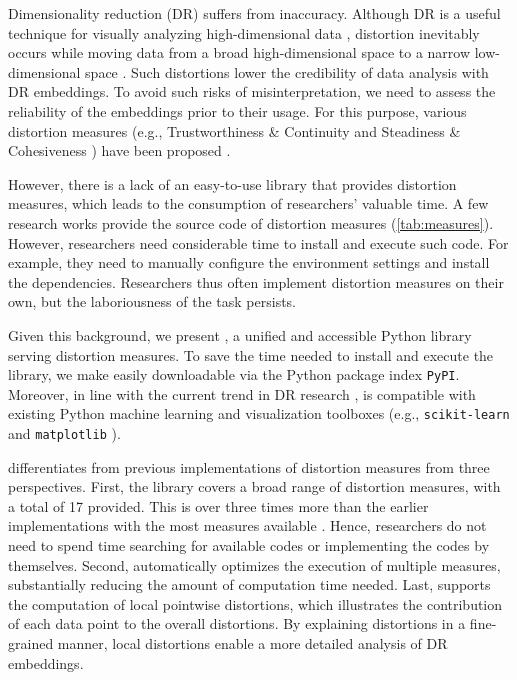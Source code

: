 Dimensionality reduction (DR) suffers from inaccuracy.
Although DR is a useful technique for visually analyzing high-dimensional data \cite{nonato19tvcg}, distortion inevitably occurs while moving data from a broad high-dimensional space to a narrow low-dimensional space \cite{nonato19tvcg, martins14cg, jeon21tvcg, jeon22arxiv}. 
Such distortions lower the credibility of data analysis with DR embeddings. 
To avoid such risks of misinterpretation, we need to assess the reliability of the embeddings prior to their usage. 
For this purpose, various distortion measures (e.g., Trustworthiness \& Continuity \cite{lee07springer} and Steadiness \& Cohesiveness \cite{jeon21tvcg}) have been proposed \cite{nonato19tvcg}. 

However, there is a lack of an easy-to-use library that provides distortion measures, which leads to the consumption of researchers' valuable time.
A few research works provide the source code of distortion measures \cite{jeon22vis, ingram15neurocomputing, fujiwara23pvis} (\autoref{tab:measures}). However, researchers need considerable time to install and execute such code. 
For example, they need to manually configure the environment settings and install the dependencies.
Researchers thus often implement distortion measures on their own, but the laboriousness of the task persists.

Given this background, we present \library, a unified and accessible Python library serving distortion measures. 
To save the time needed to install and execute the library, we make \library easily downloadable via the Python package index \texttt{PyPI}.
Moreover, in line with the current trend in DR research \cite{jeon22vis, fujiwara23pvis, jeon21tvcg, pedregosa11jmlr, mcinnes2020arxiv}, \library is compatible with  existing Python machine learning and visualization toolboxes (e.g., \texttt{scikit-learn} \cite{pedregosa11jmlr} and \texttt{matplotlib} \cite{hunter07cse}).


\library differentiates from previous implementations of distortion measures from three perspectives.
First, the library covers a broad range of distortion measures, with a total of 17 provided. This is over three times more than the earlier implementations with the most measures available \cite{jeon22vis}. Hence, researchers do not need to spend time searching for available codes or implementing the codes by themselves.
Second, \library automatically optimizes the execution of multiple measures, substantially reducing the amount of computation time needed. 
Last, \library supports the computation of local pointwise distortions, which illustrates the contribution of each data point to the overall distortions.
By explaining distortions in a fine-grained manner, local distortions enable a more detailed analysis of DR embeddings.

